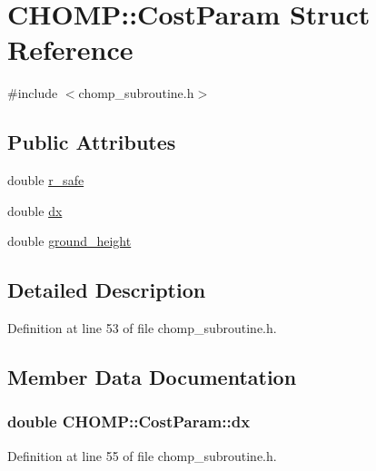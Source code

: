 \hypertarget{struct_c_h_o_m_p_1_1_cost_param}{}\section{C\+H\+O\+MP\+:\+:Cost\+Param Struct Reference}
\label{struct_c_h_o_m_p_1_1_cost_param}


{\ttfamily \#include $<$chomp\+\_\+subroutine.\+h$>$}

\subsection*{Public Attributes}
\begin{DoxyCompactItemize}
\item 
double \hyperlink{struct_c_h_o_m_p_1_1_cost_param_a9ab5a375539e209151d57dea31b4eed9}{r\+\_\+safe}
\item 
double \hyperlink{struct_c_h_o_m_p_1_1_cost_param_aac37a7ec506745fea119ff57a711b0b6}{dx}
\item 
double \hyperlink{struct_c_h_o_m_p_1_1_cost_param_afdb481a80ee8ef47dc837075993f0821}{ground\+\_\+height}
\end{DoxyCompactItemize}


\subsection{Detailed Description}


Definition at line 53 of file chomp\+\_\+subroutine.\+h.



\subsection{Member Data Documentation}
\subsubsection[{\texorpdfstring{dx}{dx}}]{\setlength{\rightskip}{0pt plus 5cm}double C\+H\+O\+M\+P\+::\+Cost\+Param\+::dx}\hypertarget{struct_c_h_o_m_p_1_1_cost_param_aac37a7ec506745fea119ff57a711b0b6}{}\label{struct_c_h_o_m_p_1_1_cost_param_aac37a7ec506745fea119ff57a711b0b6}


Definition at line 55 of file chomp\+\_\+subroutine.\+h.

